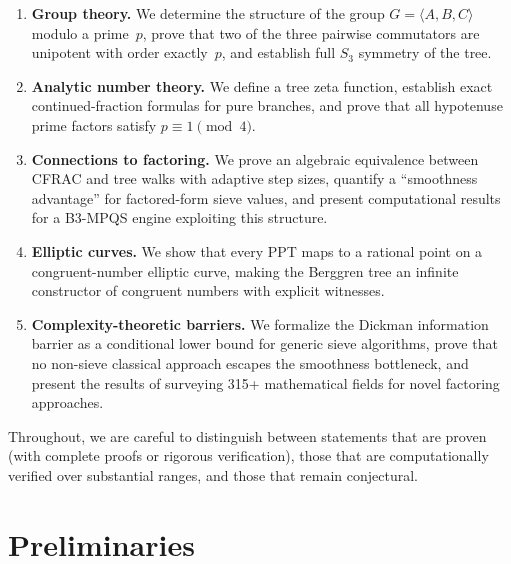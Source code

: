 \documentclass[12pt]{amsart}
\theoremstyle{definition}
\theoremstyle{remark}
\begin{document}
\begin{enumerate}[label=(\roman*)]
  \item \textbf{Group theory.}  We determine the structure of the group
    $G=\langle A,B,C\rangle$ modulo a prime~$p$, prove that two of the three
    pairwise commutators are unipotent with order exactly~$p$, and establish
    full $S_3$ symmetry of the tree.

  \item \textbf{Analytic number theory.}  We define a tree zeta function,
    establish exact continued-fraction formulas for pure branches, and prove
    that all hypotenuse prime factors satisfy $p\equiv1\pmod{4}$.

  \item \textbf{Connections to factoring.}  We prove an algebraic equivalence
    between CFRAC and tree walks with adaptive step sizes, quantify a
    ``smoothness advantage'' for factored-form sieve values, and present
    computational results for a B3-MPQS engine exploiting this structure.

  \item \textbf{Elliptic curves.}  We show that every PPT maps to a rational
    point on a congruent-number elliptic curve, making the Berggren tree an
    infinite constructor of congruent numbers with explicit witnesses.

  \item \textbf{Complexity-theoretic barriers.}  We formalize the Dickman
    information barrier as a conditional lower bound for generic sieve
    algorithms, prove that no non-sieve classical approach escapes the
    smoothness bottleneck, and present the results of surveying 315+
    mathematical fields for novel factoring approaches.
\end{enumerate}

\noindent
Throughout, we are careful to distinguish between statements that are proven
(with complete proofs or rigorous verification), those that are computationally
verified over substantial ranges, and those that remain conjectural.


\section{Preliminaries}\label{sec:prelim}
\end{document}
